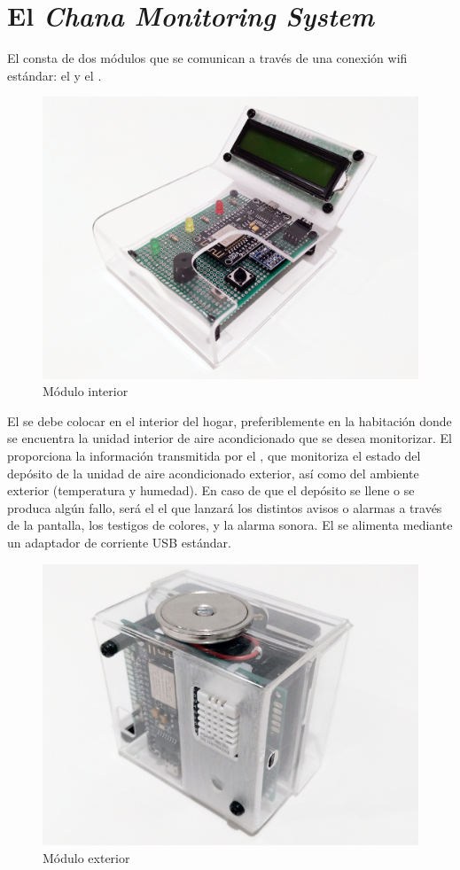 \section{El \textit{Chana Monitoring System}}
\label{sect:intro}

El \CMS consta de dos módulos que se comunican a través de una conexión wifi estándar: el \MIE y el \MEE.

\begingroup

\setlength{\columnsep}{6pt}
\setlength{\intextsep}{6pt}

\begin{figure}
  \centering
  \includegraphics[width=0.5\columnwidth]{../photos/interior.jpg}
  \caption{Módulo interior}
  \label{fig:interior}
\end{figure}

El \MIE se debe colocar en el interior del hogar, preferiblemente en la habitación donde se encuentra la unidad interior de aire acondicionado que se desea monitorizar.
El \MI proporciona la información transmitida por el \ME, que monitoriza el estado del depósito de la unidad de aire acondicionado exterior, así como del ambiente exterior (temperatura y humedad).
En caso de que el depósito se llene o se produca algún fallo, será el \MI el que lanzará los distintos avisos o alarmas a través de la pantalla, los testigos de colores, y la alarma sonora.
El \MI se alimenta mediante un adaptador de corriente USB estándar.

\begin{figure}
  \centering
  \includegraphics[width=0.5\columnwidth]{../photos/exterior.jpg}
  \caption{Módulo exterior}
  \label{fig:exterior}
\end{figure}

